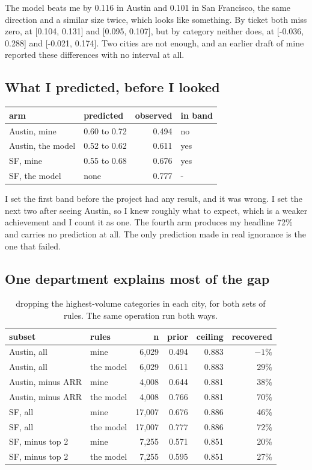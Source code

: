 \documentclass[10pt,a4paper,twocolumn]{article}
\begin{document}
The model beats me by 0.116 in Austin and 0.101 in San Francisco, the same
direction and a similar size twice, which looks like something. By ticket both
miss zero, at [0.104, 0.131] and [0.095, 0.107], but by category neither does, at
[-0.036, 0.288] and [-0.021, 0.174]. Two cities are not enough, and an earlier
draft of mine reported these differences with no interval at all.

\subsection*{What I predicted, before I looked}

\begin{center}
\footnotesize
\setlength{\tabcolsep}{4pt}
\begin{tabular}{llrl}
\toprule
arm & predicted & observed & in band \\
\midrule
Austin, mine & 0.60 to 0.72 & 0.494 & no \\
Austin, the model & 0.52 to 0.62 & 0.611 & yes \\
SF, mine & 0.55 to 0.68 & 0.676 & yes \\
SF, the model & none & 0.777 & - \\
\bottomrule
\end{tabular}
\end{center}

I set the first band before the project had any result, and it was wrong. I set
the next two after seeing Austin, so I knew roughly what to expect, which is a
weaker achievement and I count it as one. The fourth arm produces my headline 72\%
and carries no prediction at all. The only prediction made in real ignorance is
the one that failed.

\subsection*{One department explains most of the gap}

\begin{table}[t]
\centering
\footnotesize
\begin{tabular}{llrrrr}
\toprule
subset & rules & n & prior & ceiling & recovered \\
\midrule
Austin, all & mine & 6,029 & 0.494 & 0.883 & $-1\%$ \\
Austin, all & the model & 6,029 & 0.611 & 0.883 & 29\% \\
Austin, minus ARR & mine & 4,008 & 0.644 & 0.881 & 38\% \\
Austin, minus ARR & the model & 4,008 & 0.766 & 0.881 & 70\% \\
SF, all & mine & 17,007 & 0.676 & 0.886 & 46\% \\
SF, all & the model & 17,007 & 0.777 & 0.886 & 72\% \\
SF, minus top 2 & mine & 7,255 & 0.571 & 0.851 & 20\% \\
SF, minus top 2 & the model & 7,255 & 0.595 & 0.851 & 27\% \\
\bottomrule
\end{tabular}
\caption{dropping the highest-volume categories in each city, for both sets of rules. The same operation run both ways.}
\end{table}
\end{document}
